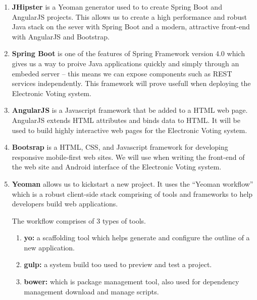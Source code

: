\begin{enumerate}
		\item \textbf{JHipster} is a Yeoman generator used to to create  Spring Boot and  AngularJS projects. This allows us to create a high performance and robust Java stack on the sever with Spring Boot and a modern, attractive front-end with AngularJS and Bootstrap.

		\item \textbf{Spring Boot} is one of the features of Spring Framework version 4.0 which gives us a way to proive Java applications quickly and simply through an embeded server – this means we can expose components such as REST services independently. This framework will prove usefull when deploying the Electronic Voting system. 
		
		\item \textbf{AngularJS} is a Javascript framework that be added to a HTML web page. AngularJS extends HTML attributes and binds data to HTML. It will be used to build highly interactive web pages for the Electronic Voting system. 
		
		\item \textbf{Bootsrap} is a HTML, CSS, and Javascript framework for developing responsive mobile-first web sites. We will use when writing the front-end of the web site and Android interface of the Electronic Voting system. 
		
		\item \textbf{Yeoman} allows us to kickstart a new project. It uses the “Yeoman workflow” which is a robust client-side stack comprising of tools and frameworks to help developers build web applications.
		
		The workflow comprises of 3 types of tools.  
		\begin{enumerate}
			\item \textbf{yo:} a scaffolding tool which helps generate and configure the outline of a new application. 
			\item \textbf{gulp:} a system build too used to preview and test a project. 
			\item \textbf{bower:} which is package management tool, also used for dependency management download and manage scripts.
		\end{enumerate} 
\end{enumerate} 